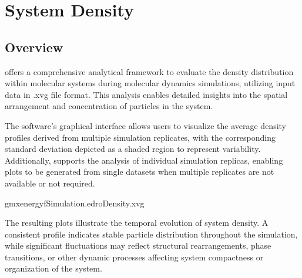 \documentclass[a4paper,10pt,english]{sphinxmanual}
\begin{document}
\sphinxstepscope


\chapter{System Density}
\label{\detokenize{Density:system-density}}\label{\detokenize{Density::doc}}

\section{Overview}
\label{\detokenize{Density:overview}}
\sphinxAtStartPar
{} offers a comprehensive analytical framework to evaluate the density distribution within molecular systems during molecular dynamics simulations, utilizing input data in .xvg file format. This analysis enables detailed insights into the spatial arrangement and concentration of particles in the system.

\sphinxAtStartPar
The software’s graphical interface allows users to visualize the average density profiles derived from multiple simulation replicates, with the corresponding standard deviation depicted as a shaded region to represent variability. Additionally,  supports the analysis of individual simulation replicas, enabling plots to be generated from single datasets when multiple replicates are not available or not required.

\sphinxAtStartPar
{}

\begin{sphinxVerbatim}[commandchars=\\\{\}]
gmxenergy\PYGZhy{}fSimulation.edr\PYGZhy{}oDensity.xvg
\end{sphinxVerbatim}

\begin{sphinxVerbatim}[commandchars=\\\{\}]
   
\end{sphinxVerbatim}

\noindent{}

\sphinxAtStartPar
{} The resulting plots illustrate the temporal evolution of system density. A consistent profile indicates stable particle distribution throughout the simulation, while significant fluctuations may reflect structural rearrangements, phase transitions, or other dynamic processes affecting system compactness or organization of the system.
\end{document}
